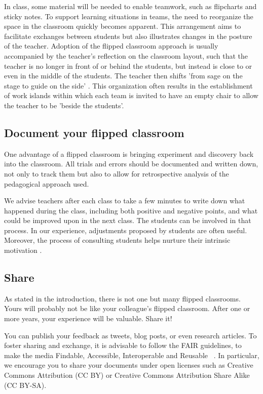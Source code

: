 \documentclass[10pt,letterpaper]{article}
\begin{document}
In class, some material will be needed to enable teamwork, such as flipcharts and sticky notes. 
To support learning situations in teams, the need to reorganize the space in the classroom quickly becomes apparent. 
This arrangement aims to facilitate exchanges between students but also illustrates changes in the posture of the teacher. 
Adoption of the flipped classroom approach is usually accompanied by the teacher’s reflection on the classroom layout, such that the teacher is no longer in front of or behind the students, but instead is close to or even in the middle of the students. 
The teacher then shifts 'from sage on the stage to guide on the side' \cite{king_sage_1993}. 
This organization often results in the establishment of work islands within which each team is invited to have an empty chair to allow the teacher to be 'beside the students'.


\subsection{Document your flipped classroom}

One advantage of a flipped classroom is bringing experiment and discovery back into the classroom. All trials and errors should be documented and written down, not only to track them but also to allow for retrospective analysis of the pedagogical approach used.

We advise teachers after each class to take a few minutes to write down what happened during the class, including both positive and negative points, and what could be improved upon in the next class. The students can be involved in that process. 
In our experience, adjustments proposed by students are often useful. Moreover, the process of consulting students helps nurture their intrinsic motivation \cite{oraif2018investigation,thai_impact_2017}.


\subsection{Share}

As stated in the introduction, there is not one but many flipped classrooms. Yours will probably not be like your colleague's flipped
classroom. After one or more years, your experience will be valuable. Share it!

You can publish your feedback as tweets, blog posts, or even research articles. To foster sharing and exchange, it is advisable to follow the FAIR guidelines, to make the media Findable, Accessible, Interoperable and Reusable ~\cite{garcia2020ten}. In particular, we encourage you to share your documents under open licenses such as Creative Commons Attribution (CC BY) or Creative Commons Attribution Share Alike (CC BY-SA).
\end{document}
